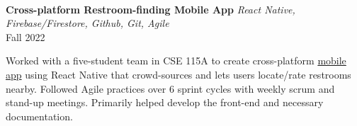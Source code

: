 \documentclass[letterpaper,10pt]{article}
\begin{document}
\begin{multicols*}{2}
  \vspace{1em} \\
  {
  \fontsize{11pt}{\baselineskip}\selectfont
  \textbf{Cross-platform Restroom-finding Mobile App}
  }
  \textit{React Native, Firebase/Firestore, Github, Git, Agile} \\
  Fall 2022
  \vspace{5px} \\
  \begin{minipage}{.5\textwidth}
    \begin{flushleft}
      Worked with a five-student team in CSE 115A to create cross-platform \href{https://github.com/CSE115AWinter2022-WePee}{mobile app} using React Native that crowd-sources and lets users locate/rate restrooms nearby. Followed Agile practices over 6 sprint cycles with weekly scrum and stand-up meetings. Primarily helped develop the front-end and necessary documentation.
    \end{flushleft}
  \end{minipage}
\end{multicols*}
\end{document}
